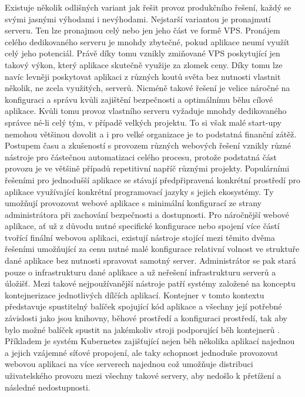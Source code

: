 \begin{itemize}
\begin{itemize}
		Existuje několik odlišných variant jak řešit provoz produkčního řešení, každý se svými jasnými výhodami i nevýhodami.
		Nejstarší variantou je pronajmutí serveru.
		Ten lze pronajmou celý nebo jen jeho část ve formě \noindent\Ac{VPS}.
		Pronájem celého dedikovaného serveru je mnohdy zbytečné, pokud aplikace neumí využít celý jeho potenciál.
		Právě díky tomu vznikly zmiňované \noindent\Ac{VPS} poskytující jen takový výkon, který aplikace skutečně využije za
		zlomek ceny.
		Díky tomu lze navíc levněji poskytovat aplikaci z různých koutů světa bez nutnosti vlastnit několik, ne zcela
		využitých, serverů.
		Nicméně takové řešení je velice náročné na konfiguraci a správu kvůli zajištění bezpečnosti a optimálnímu běhu cílové
		aplikace.
		Kvůli tomu provoz vlastního serveru vyžaduje mnohdy dedikovaného správce né-li celý tým, v případě velkých projektu.
		To si však malé start-upy nemohou většinou dovolit a i pro velké organizace je to podstatná finanční zátěž.
		Postupem času a zkušeností s provozem různých webových řešení vznikly různé nástroje pro částečnou automatizaci
		celého procesu, protože podstatná část provozu je ve většině případů repetitivní napříč různými projekty.
		Populárními řešeními pro jednodušší aplikace se stávají předpřipravená konkrétní prostředí pro aplikace využívající
		konkrétní programovací jazyky s jejich ekosystémy.
		Ty umožňují provozovat webové aplikace s minimální konfigurací ze strany administrátora při zachování bezpečnosti
		a dostupnosti.
		Pro náročnější webové aplikace, ať už z důvodu nutné specifické konfigurace nebo spojení více částí tvořící finální
		webovou aplikaci, existují nástroje stojící mezi těmito dvěma řešeními umožňující za cenu nutné malé konfigurace
		relativní volnost ve struktuře dané aplikace bez nutnosti spravovat samotný server.
		Administrátor se pak stará pouze o infrastrukturu dané aplikace a už neřešení infrastrukturu serverů a úložišť.
		Mezi takové nejpoužívanější nástroje patří systémy založené na konceptu kontejnerizace jednotlivých dílčích aplikací.
		Kontejner v tomto kontextu představuje spustitelný balíček spojující kód aplikace a všechny její potřebné závislosti jako jsou
		knihovny, běhové prostředí a konfiguraci prostředí, tak aby bylo možné balíček spustit na jakémkoliv stroji podporující
		běh kontejnerů \cite{what_is_container}.
		Příkladem je systém Kubernetes zajišťující nejen běh několika aplikací najednou a jejich vzájemné síťové propojení,
		ale taky schopnost jednoduše provozovat webovou aplikaci na více serverech najednou což umožňuje distribuci
		uživatelského provozu mezi všechny takové servery, aby nedošlo k přetížení a následné nedostupnosti.

\end{itemize}
\end{itemize}
